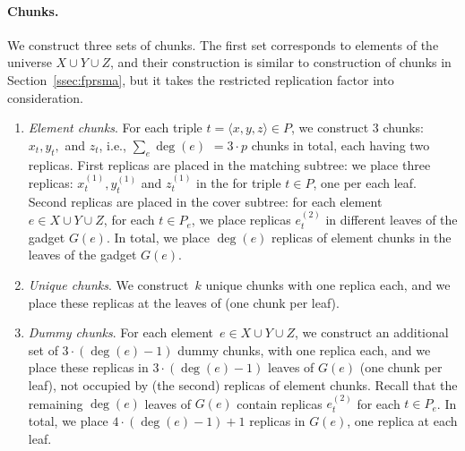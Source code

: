 \paragraph{Chunks.}
We construct three sets of chunks.
The first set corresponds to elements of the universe $X\cup Y\cup Z$, and their construction is similar to construction of chunks in Section~\ref{ssec:fprsma}, but it takes the restricted replication factor into consideration.
\begin{enumerate}
  \item \emph{Element chunks}. For each triple $t = \langle x, y, z \rangle \in P$, we construct $3$ chunks:~$x_t, y_t,$ and $z_t$, i.e., $\sum_e\deg(e)$ $=3\cdot p$ chunks in total,
  each having two replicas.
  First replicas are placed in the matching subtree:
  we place
  three replicas: $x_t^{(1)}, y_t^{(1)}$ and $z_t^{(1)}$ in the {\TripleGadget} for triple $t\in P$, one per each leaf.
  Second replicas are placed in the cover subtree:
  for each element $e \in X\cup Y\cup Z$, for each $t \in P_e$,
  we place replicas $e_t^{(2)}$ in different leaves of the gadget $G(e)$.
  In total, we place $\deg(e)$ replicas of element chunks in the leaves of the gadget $G(e)$.
  \item \emph{Unique chunks}. We construct~$k$ unique chunks with one replica each, and we place these replicas at the leaves of {\UnqGadgets} (one chunk per leaf).
  \item \emph{Dummy chunks}. For each element~$e\in X\cup Y\cup Z$,
  we construct an additional set of $3\cdot(\deg(e) - 1)$ dummy chunks, with one replica each, and we place these replicas in $3\cdot (\deg(e)-1)$ leaves of $G(e)$ (one chunk per leaf),
  not occupied by (the second) replicas of element chunks.
  Recall that the remaining $\deg(e)$ leaves of $G(e)$ contain replicas $e_t^{(2)}$ for each $t \in P_e$. In total, we place $4\cdot (\deg(e) - 1) + 1$ replicas in $G(e)$, one replica at each leaf.
\end{enumerate}

